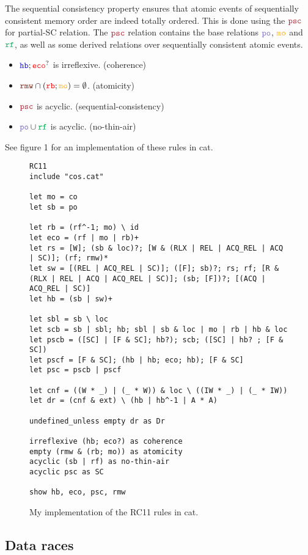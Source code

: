 \documentclass[a4,11pt,dvipsnames]{article}
\begin{document}
The sequential consistency property ensures that atomic events of sequentially consistent memory order are indeed totally ordered. This is done using the $\psc$ for partial-SC relation. The $\psc$ relation contains the base relations $\po$, $\mo$ and $\rf$, as well as some derived relations over sequentially consistent atomic events.

\begin{itemize}
\item $\texttt{\color{blue}hb} ; \texttt{\color{red}eco} ^?$ is irreflexive. \hfill (coherence)
\item $\rmw \cap (\rb ; \mo) = \emptyset$. \hfill (atomicity)
\item $\psc$ is acyclic. \hfill (sequential-consistency)
\item $\po \cup \rf$ is acyclic. \hfill (no-thin-air)
\end{itemize}
{\footnotesize{See figure 1 for an implementation of these rules in cat.}}
\begin{figure}
\centering
\begin{lstlisting}
RC11
include "cos.cat"

let mo = co
let sb = po

let rb = (rf^-1; mo) \ id
let eco = (rf | mo | rb)+
let rs = [W]; (sb & loc)?; [W & (RLX | REL | ACQ_REL | ACQ | SC)]; (rf; rmw)*
let sw = [(REL | ACQ_REL | SC)]; ([F]; sb)?; rs; rf; [R & (RLX | REL | ACQ | ACQ_REL | SC)]; (sb; [F])?; [(ACQ | ACQ_REL | SC)]
let hb = (sb | sw)+

let sbl = sb \ loc
let scb = sb | sbl; hb; sbl | sb & loc | mo | rb | hb & loc
let pscb = ([SC] | [F & SC]; hb?); scb; ([SC] | hb? ; [F & SC])
let pscf = [F & SC]; (hb | hb; eco; hb); [F & SC]
let psc = pscb | pscf

let cnf = ((W * _) | (_ * W)) & loc \ ((IW * _) | (_ * IW))
let dr = (cnf & ext) \ (hb | hb^-1 | A * A)

undefined_unless empty dr as Dr

irreflexive (hb; eco?) as coherence
empty (rmw & (rb; mo)) as atomicity
acyclic (sb | rf) as no-thin-air
acyclic psc as SC

show hb, eco, psc, rmw
\end{lstlisting}
\caption{My implementation of the RC11 rules in cat.}
\label{fig:rc11-cat-code}
\end{figure}

\subsection{Data races}
\end{document}
